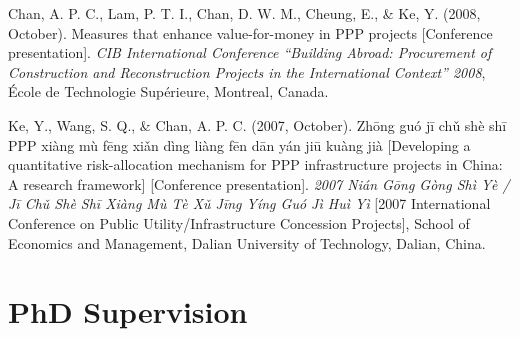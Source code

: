 \documentclass[11pt,a4paper]{report} %
\begin{document}
\begin{tablist}
        \item[2008] \tab{}Chan, A. P. C., Lam, P. T. I., Chan, D. W. M., Cheung, E., \& Ke, Y. (2008, October). Measures that enhance value-for-money in PPP projects [Conference presentation]. \textit{CIB International Conference “Building Abroad: Procurement of Construction and Reconstruction Projects in the International Context” 2008}, École de Technologie Supérieure, Montreal, Canada.
        
        \item[2007] \tab{}Ke, Y., Wang, S. Q., \& Chan, A. P. C. (2007, October). Zhōng guó jī chǔ shè shī PPP xiàng mù fēng xiǎn dìng liàng fēn dān yán jiū kuàng jià [Developing a quantitative risk-allocation mechanism for PPP infrastructure projects in China: A research framework] [Conference presentation]. \textit{2007 Nián Gōng Gòng Shì Yè / Jī Chǔ Shè Shī Xiàng Mù Tè Xǔ Jīng Yíng Guó Jì Huì Yì} [2007 International Conference on Public Utility/Infrastructure Concession Projects], School of Economics and Management, Dalian University of Technology, Dalian, China.
    
    \end{tablist}



    \section*{PhD Supervision}
\end{document}
